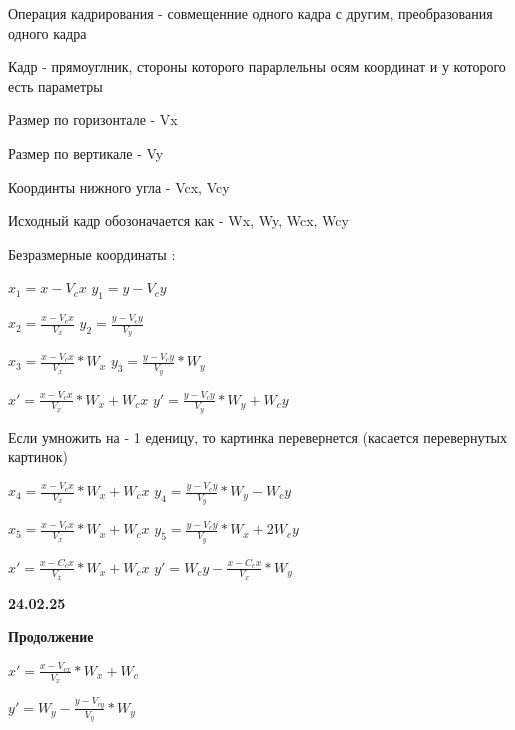 \documentclass{article}
\begin{document}
Операция кадрирования - совмещенние одного кадра с другим, преобразования одного кадра

Кадр - прямоуглник, стороны которого парарлельны осям координат и у которого есть параметры
 
Размер по горизонтале - Vx

Размер по вертикале - Vy

Координты нижного угла -  Vcx, Vcy


Исходный кадр обозоначается как - Wx, Wy, Wcx, Wcy

Безразмерные координаты :


$x_1 = x-V_cx$ \hspace{21mm} $y_1 = y-V_cy$
\vspace{1mm}

$x_2 = \frac{x-V_cx}{V_x}$ \hspace{22mm} $y_2 = \frac{y-V_cy}{V_y}$
\vspace{1mm}

$x_3 = \frac{x-V_cx}{V_x}*W_x$ \hspace{15mm} $y_3 = \frac{y-V_cy}{V_y}*W_y$
\vspace{1mm}

$x' = \frac{x-V_cx}{V_x}*W_x+W_cx$ \hspace{3mm} $y' = \frac{y-V_cy}{V_y}*W_y+W_cy$

\vspace{5mm}


Если умножить на - 1 еденицу, то картинка перевернется (касается перевернутых картинок)

$x_4=\frac{x-V_cx}{V_x}*W_x+W_cx$ \hspace{3mm}  $y_4= \frac{y-V_cy}{V_y}*W_y-W_cy$

\vspace{1mm}

$x_5 = \frac{x-V_cx}{V_x}*W_x+W_cx$ \hspace{3mm} $y_5 = \frac{y-V_cy}{V_y}*W_x+2W_cy$


$x' = \frac{x-C_cx}{V_x}* W_x+W_cx$ \hspace{3mm}$y' = W_cy- \frac{x-C_cx}{V_x}* W_y$

\vspace{5mm}

\textbf{24.02.25}

\textbf{Продолжение}

$x' = \frac{x-V_{cx}}{V_x} * W_x+W_c$

\vspace{5mm}

$y' = W_y - \frac{y-V_{cy}}{V_y} * W_y$
\end{document}
